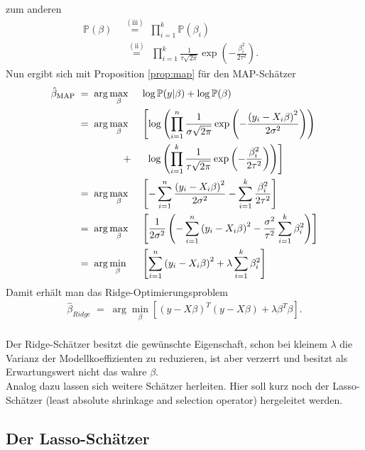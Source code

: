 zum anderen
\begin{align*}
	\mathbb{P}(\beta)&\;\overset{(\text{iii})}{=}\;\prod_{i=1}^{k}\mathbb{P}(\beta_i)\\
	&\,\,\:\!\overset{(\text{ii})}{=}\:\,\prod_{i=1}^{k}\frac{1}{\tau\sqrt{2\pi}}\exp\left(-\frac{\beta_i^2}{2\tau^2}\right).\qquad\;\;\:
\end{align*}
Nun ergibt sich mit Proposition \autoref{prop:map} für den MAP-Schätzer
\begin{alignat*}{2}
	\hat{\beta}_{\text{MAP}}&\;=\;\arg\underset{\beta}{\max}&& \log\mathbb{P}(y\vert \beta) + \log \mathbb{P}(\beta) \\
	&\;=\;\arg\underset{\beta}{\max}&&\left[\log\left(\prod_{i=1}^{n}\frac{1}{\sigma\sqrt{2\pi}}\exp\left(-\frac{\left(y_i-X_i\beta\right)^2}{2\sigma^2}\right)\right)\right.\\	&\hspace{1,7cm}+&&\:\:\left.\log\left(\prod_{i=1}^{k}\frac{1}{\tau\sqrt{2\pi}}\exp\left(-\frac{\beta_i^2}{2\tau^2}\right)\right)\right]\\
	&\;=\;\arg\underset{\beta}{\max} && \left[-\sum_{i=1}^{n}\frac{\left(y_i-X_i\beta\right)^2}{2\sigma^2}-\sum_{i=1}^{k}\frac{\beta_i^2}{2\tau^2}\right]\\
	&\;=\;\arg\underset{\beta}{\max} && \left[\frac{1}{2\sigma^2}\left(-\sum_{i=1}^{n}\left(y_i-X_i\beta\right)^2-\frac{\sigma^2}{\tau^2}\sum_{i=1}^{k}\beta_i^2\right)\right]\\
	&\;=\;\arg\underset{\beta}{\min} && \left[\sum_{i=1}^{n}\left(y_i-X_i\beta\right)^2+\lambda\sum_{i=1}^{k}\beta_i^2\right]\\
\end{alignat*}
Damit erhält man das Ridge-Optimierungsproblem
\begin{align*}
	\hat{\beta}_{Ridge}\;=\;\arg\underset{\beta}{\min}\left[\left(y-X\beta\right)^T\left(y-X\beta\right)+\lambda \beta^T\beta\right].
\end{align*}
\hfill\\ Der Ridge-Schätzer besitzt die gewünschte Eigenschaft, schon bei kleinem \(\lambda\) die Varianz der Modellkoeffizienten zu reduzieren, ist aber verzerrt und besitzt als Erwartungswert nicht das wahre \(\beta\). \\
Analog dazu lassen sich weitere Schätzer herleiten. Hier soll kurz noch der Lasso-Schätzer (least absolute shrinkage and selection operator) hergeleitet werden.

\subsection{Der Lasso-Schätzer}

